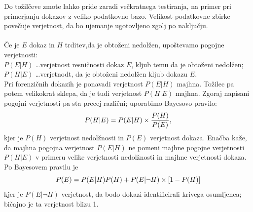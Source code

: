\documentclass[mat1, tisk]{fmfdelo}
\theoremstyle{definition} %
\theoremstyle{trditev} %
\theoremstyle{izrek}
\begin{document}
Do tožilčeve zmote lahko pride zaradi večkratnega testiranja, na primer pri primerjanju dokazov z veliko podatkovno bazo. Velikost podatkovne
zbirke povečuje verjetnost, da bo ujemanje ugotovljeno zgolj po naključju. \\\\
Če je $E$ dokaz in $H$ trditev,da je obtoženi nedolžen, upoštevamo pogojne verjetnosti: \\
$P(E \lvert H)$ \dots verjetnost resničnosti dokaz $E$, kljub temu da je obtoženi nedolžen; \\
$P(H \lvert E)$ \dots verjetnodt, da je obtoženi nedolžen kljub dokazu $E$. \\
Pri forenzičnih dokazih je ponavadi verjetnost $P(E \lvert H)$ majhna. Tožilec pa potem velikokrat sklepa, da je tudi verjetnost
$P(H \lvert E)$ majhna.
Zgoraj napisani pogojni verjetnosti pa sta precej različni; uporabimo Bayesovo pravilo:
\[
   P(H \lvert E) = P(E \lvert H) \times \frac{P(H)}{P(E)}, \vspace{2mm}
\]
kjer je $P(H)$ verjetnost nedolžnosti in $P(E)$ verjetnost dokaza. Enačba kaže, da majhna pogojna verjetnost $P(E \lvert H)$ ne pomeni majhne
pogojne verjetnosti $P(H \lvert E)$ v primeru velike verjetnosti nedolžnosti in majhne verjetnosti dokaza. \\
Po Bayesovem pravilu je
\[
   P(E)=P(E \lvert H)P(H) + P(E \lvert \neg H)\times[1 - P(H)] \vspace{2mm}
\]
kjer je $P(E \lvert \neg H)$ verjetnost, da bodo dokazi identificirali krivega osumljenca; bičajno je ta verjetnost blizu 1.
\end{document}
